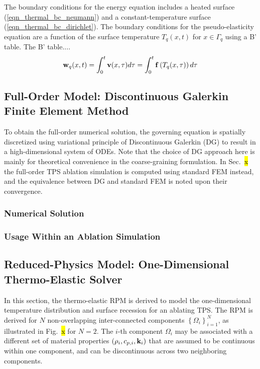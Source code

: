 The boundary conditions for the energy equation includes a heated surface (\cref{eqn_thermal_bc_neumann}) and a constant-temperature surface (\cref{eqn_thermal_bc_dirichlet}). The boundary conditions for the pseudo-elasticity equation are a function of the surface temperature $T_q(x,t)$ for $x\in\Gamma_q$ using a B' table. The B' table....
\begin{equation}
    \mathbf{w}_q(x,t) = \int_{0}^{t} \mathbf{v}(x,\tau)d\tau = \int_{0}^{t}\mathbf{f}\left(T_q(x,\tau)\right)d\tau
\end{equation}


\subsection{Full-Order Model: Discontinuous Galerkin Finite Element Method}

To obtain the full-order numerical solution, the governing equation is spatially discretized using variational principle of Discontinuous Galerkin (DG) to result in a high-dimensional system of ODEs. Note that the choice of DG approach here is mainly for theoretical convenience in the coarse-graining formulation. In Sec.~\hl{x} the full-order TPS ablation simulation is computed using standard FEM instead, and the equivalence between DG and standard FEM is noted upon their convergence.

\subsubsection{Numerical Solution}

\subsubsection{Usage Within an Ablation Simulation}


\subsection{Reduced-Physics Model: One-Dimensional Thermo-Elastic Solver}

In this section,  the thermo-elastic RPM is derived to model the one-dimensional temperature distribution and surface recession for an ablating TPS. The RPM is derived for $N$ non-overlapping inter-connected components $\left\{\Omega_i\right\}_{i=1}^{N}$, as illustrated in Fig.~\hl{x} for $N=2$. The $i$-th component $\Omega_i$ may be associated with a different set of material properties $\left(\rho_i, c_{p,i}, \mathbf{k}_i\right)$ that are assumed to be continuous within one component, and can be discontinuous across two neighboring components.

